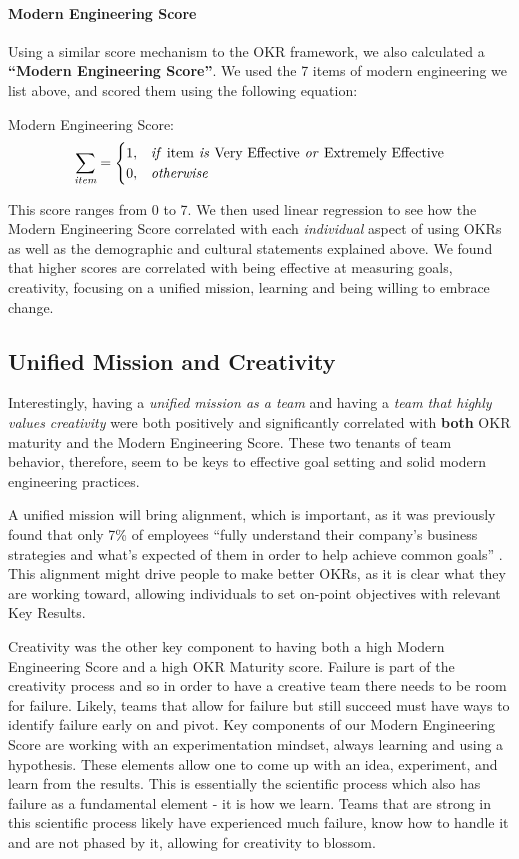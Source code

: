 \documentclass[sigconf, nonacm]{acmart}
\begin{document}
\paragraph{Modern Engineering Score}
Using a similar score mechanism to the OKR framework, we also calculated a \textbf{``Modern Engineering Score''}. We used the 7 items of modern engineering we list above, and scored them using the following equation:

\medskip
Modern Engineering Score:
\begin{equation}
    \sum\limits_{\textit{item}} = 
    \begin{cases}
    1, & \emph{if \emph{item} is \emph{Very Effective} or \emph{Extremely Effective}} \\
    0, & \emph{otherwise}
    \end{cases}
\end{equation}

This score ranges from 0 to 7. We then used linear regression to see how the Modern Engineering Score correlated with each \emph{individual} aspect of using OKRs as well as the demographic and cultural statements explained above. We found that higher scores are correlated with being effective at measuring goals, creativity, focusing on a unified mission, learning and being willing to embrace change. 

\subsection{Unified Mission and Creativity}
Interestingly, having a \emph{unified mission as a team} and having a \emph{team that highly values creativity} were both positively and significantly correlated with \textbf{both} OKR maturity and the Modern Engineering Score. These two tenants of team behavior, therefore, seem to be keys to effective goal setting and solid modern engineering practices.

A unified mission will bring alignment, which is important, as it was previously found that only 7\% of employees ``fully understand their company's business strategies and what's expected of them in order to help achieve common goals'' \cite{kaplanBook}. This alignment might drive people to make better OKRs, as it is clear what they are working toward, allowing individuals to set on-point objectives with relevant Key Results. 

Creativity was the other key component to having both a high Modern Engineering Score and a high OKR Maturity score. Failure is part of the creativity process \cite{PsychologyToday} and so in order to have a creative team there needs to be room for failure. Likely, teams that allow for failure but still succeed must have ways to identify failure early on and pivot. Key components of our Modern Engineering Score are working with an experimentation mindset, always learning and using a hypothesis. These elements allow one to come up with an idea, experiment, and learn from the results. This is essentially the scientific process which also has failure as a fundamental element - it is how we learn. Teams that are strong in this scientific process likely have experienced much failure, know how to handle it and are not phased by it, allowing for creativity to blossom.
\end{document}

